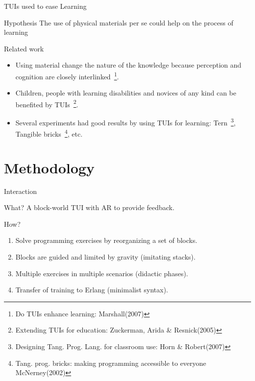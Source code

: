 \begin{frame} {TUIs used to ease Learning}
  \begin{block}{Hypothesis}
    The use of physical materials per se could help on the
    process of learning
  \end{block}
  \begin{block}{Related work}
    \begin{itemize}
    \item Using material change the nature of the knowledge
      because perception and cognition are closely interlinked~\footnote{Do
        TUIs enhance learning: Marshall(2007)}.
    \item Children, people with learning disabilities and novices of any kind can
      be benefited by TUIs~\footnote{Extending TUIs for education: Zuckerman, Arida \& Resnick(2005)}.
    \item Several experiments had good results by using TUIs for learning:
      Tern~\footnote{Designing Tang. Prog. Lang. for classroom use: Horn \& Robert(2007)},
      Tangible bricks~\footnote{Tang. prog. bricks: making programming accessible to everyone McNerney(2002)}, etc.
    \end{itemize}
  \end{block}
\end{frame}

\section{Methodology}


\begin{frame}{Interaction}
  \begin{block} {What?}
    A block-world TUI with AR to provide feedback.
  \end{block}
  \begin{block} {How?}
    \begin{enumerate}
    \item Solve programming exercises by reorganizing a set of blocks.
    \item Blocks are guided and limited by gravity (imitating stacks).
    \item Multiple exercises in multiple scenarios (didactic phases).
    \item Transfer of training to Erlang (minimalist syntax).
    \end{enumerate}
  \end{block}
\end{frame}

